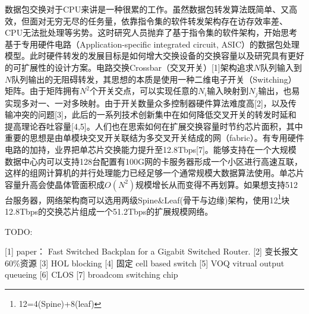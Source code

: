 
数据包交换对于CPU来讲是一种很累的工作。虽然数据包转发算法既简单、又高效，但面对无穷无尽的任务量，依靠指令集的软件转发架构存在访存效率差、CPU无法批处理等劣势。这时研究人员抛弃了基于指令集的软件架构，开始思考基于专用硬件电路（Application-specific integrated circuit, ASIC）的数据包处理模型。此时硬件转发的发展目标是如何增大交换设备的交换容量以及研究具有更好的可扩展性的设计方案。电路交换Crossbar（交叉开关）[1]架构追求$N$队列输入到$N$队列输出的无阻碍转发，其思想的本质是使用一种二维电子开关（Switching）矩阵。由于矩阵拥有$N^2$个开关交点，可以实现任意的$N_i$输入映射到$N_j$输出，也易实现多对一、一对多映射。由于开关数量众多控制器硬件算法难度高[2]，以及传输冲突的问题[3]，此后的一系列技术创新集中在如何降低交叉开关的转发时延和提高理论吞吐容量[4,5]。人们也在思索如何在扩展交换容量时节约芯片面积，其中重要的思想是由单模块交叉开关联结为多交叉开关结成的网（fabric）。有专用硬件电路的加持，业界把单芯片交换能力提升至12.8Tbps[7]。能够支持在一个大规模数据中心内可以支持128台配置有100G网的卡服务器形成一个小区进行高速互联，这样的组网计算机的并行处理能力已经足够一个通常规模大数据算法使用。单芯片容量升高会使晶体管面积成$O(N^2)$规模增长从而变得不再划算。如果想支持512台服务器，网络架构商可以选用两级Spine\&Leaf(骨干与边缘)架构，使用12\footnote{12=4(Spine)+8(leaf)}块12.8Tbps的交换芯片组成一个51.2Tbps的扩展规模网络。

TODO:%



[1] paper： Fast Switched Backplan for a Gigabit Switched Router.
[2] 变长报文 60\%资源
[3] HOL blocking
[4] 固定 cell based switch 
[5] VOQ vitrual output queueing
[6] CLOS
[7] broadcom switching chip

























